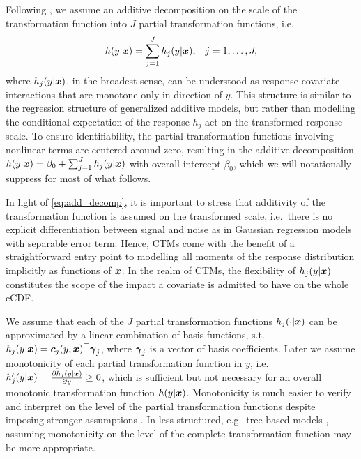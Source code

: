 \documentclass[12pt]{article}
\theoremstyle{plain}
\begin{document}
Following \cite{hothorn2014}, we assume an additive decomposition on the scale of the transformation function into $J$ partial transformation functions, i.e.
\begin{equation}
\begin{aligned}
h(y|\text{\boldmath$x$}) &= \sum_{j=1}^J h_j(y|\text{\boldmath$x$}), &j=1,\ldots, J,
\end{aligned}\label{eq:add_decomp}
\end{equation}
where $h_j(y|\text{\boldmath$x$})$, in the broadest sense, can be understood as response-covariate interactions that are monotone only in direction of $y$. This structure is similar to the regression structure of generalized additive models, but rather than modelling the conditional expectation of the response $h_j$ act on the transformed response scale. To ensure identifiability, the partial transformation functions involving nonlinear terms are centered around zero, resulting in the additive decomposition $h(y|\text{\boldmath$x$}) = \beta_0 + \sum_{j=1}^J h_j(y|\text{\boldmath$x$})$ with overall intercept $\beta_0$, which we will notationally suppress for most of what follows.

In light of \eqref{eq:add_decomp}, it is important to stress that additivity of the transformation function is assumed on the transformed scale, i.e.\ there is no explicit differentiation between signal and noise as in Gaussian regression models with separable error term. Hence, CTMs come with the benefit of a straightforward entry point to modelling all moments of the response distribution implicitly as functions of $\text{\boldmath$x$}$. In the realm of CTMs, the flexibility of $h_j(y|\text{\boldmath$x$})$ constitutes the scope of the impact a covariate is admitted to have on the whole cCDF.

We assume that each of the $J$ partial transformation functions $h_j(\cdot|\text{\boldmath$x$})$ can be approximated by a linear combination of basis functions, s.t.~$h_j(y|\text{\boldmath$x$})  = \text{\boldmath$c$}_j(y,\text{\boldmath$x$})^\top \text{\boldmath$\gamma$}_j$,
where $\text{\boldmath$\gamma$}_j$ is a vector of basis coefficients. Later we assume monotonicity of each partial transformation function in $y$, i.e.\ $h_j^\prime(y|\text{\boldmath$x$}) = \frac{\partial h_j(y|\text{\boldmath$x$})}{\partial y} \ge 0$, which is sufficient but not necessary for an overall monotonic transformation function $h(y|\text{\boldmath$x$})$. Monotonicity is much easier to verify and interpret on the level of the partial transformation functions despite imposing stronger assumptions \citep{hothorn2014}. In less structured, e.g.~tree-based models \citep{HotZei2021}, assuming monotonicity  on the level of the complete transformation function may be more appropriate.
\end{document}
